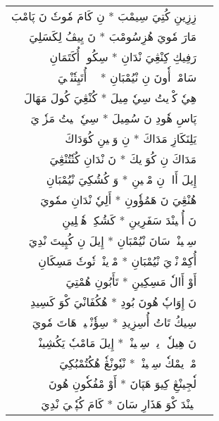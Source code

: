 \documentclass[a4paper, 12pt]{report}
\begin{document}
\begin{longtable}{rl}
\textarabic{زِزِينِ كُتِيَ سِيمْبَ  *  نِ كَامَ مٗوتٗ نَ پَامْبَ} & \\ 
\textarabic{مَارَ مٗويَ هُزِسُومْبَ  *  نَ يِيڤُ لِكَسَلِيَ} & \\ 
[8mm] 

\textarabic{رَفِيكِ كِنْڠِيَ نْدَانِ  *  سِكُويٖ أُكَتَمَانِ} & \\ 
\textarabic{سَامْبٖ أٗونَ نِ نْيُمْبَانِ  *  هٖئٖ أُتَيِتٗنْڠٖيَ} & \\ 
[8mm] 

\textarabic{هِيٗ كْوٖيتُ سِيٗ مِيلَ  *  كُنْڠِيَ كُولَ مَهَالَ} & \\ 
\textarabic{پَاسِ هٗودِ نَ سُمِيلَ  *  سِيٗ يٖيتُ مَزٗوٖيَ} & \\ 
[8mm] 

\textarabic{يَلِنَكَازِ مَدَاكَ  *  نِ وَڠٖينِ كُوَدَاكَ} & \\ 
\textarabic{مَدَاكَ نِ كُوَوٖيكَ  *  نَ نْدَانِ كُتٗتُنْڠِيَ} & \\ 
[8mm] 

\textarabic{إِيلَ أَاوٖ نِ مْڠٖينِ  *  وَ كُشُكِيَ نْيُمْبَانِ} & \\ 
\textarabic{هُنْڠِيَ نَ هَمُؤٗونِ  *  أَلِيٗ نْدَانِ ممٗويَ} & \\ 
[8mm] 

\textarabic{نَ أُچٖينْدَ سَفَرِينِ  *  كَشُكِيٖ هٗتٖلِينِ} & \\ 
\textarabic{سِپٖينْدٖ سَانَ نْيُمْبَانِ  *  إِيلَ نِ كُپِيتَ نْدِيَ} & \\ 
[8mm] 

\textarabic{أُكِمْوٖنْدٖيَ نْيُمْبَانِ  *  مْوٖينْيٖ تٗوتٗ مَسِكَانِ} & \\ 
\textarabic{أَوْ أَالٗ مَسِكِينِ  *  تَأَبُونِ هُمْتِيَ} & \\ 
[8mm] 

\textarabic{نَ إِوَاپٗ هُونَ بُودِ  *  هُكُفَانْيَ كْوَ كَسِيدِ} & \\ 
\textarabic{سِيكُ تَاتُ أُسِزِيدِ  *  سِؤٗنْڠٖيزٖ هَاتَ مٗويَ} & \\ 
[8mm] 

\textarabic{نَ هِيلٗ وٖيوٖ سِتٖينْدٖ  *  إِيلَ مَامْبٗ يَكُشِينْدٖ} & \\ 
\textarabic{مْتٖرٖيمْكٗ سِپٖينْدٖ  *  نْيٗونْڠٗ هُكُتُمْبُكِيَ} & \\ 
[8mm] 

\textarabic{لٗجِينْڠِ كِيوَ هَپَانَ  *  أَوْ مْفُكٗونِ هُونَ} & \\ 
\textarabic{نٖينْدَ كْوَ هَذَارِ سَانَ  *  كَامَ كُپٗتٖيَ نْدِيَ} & \\ 
[8mm] 


\end{longtable}
\end{document}

